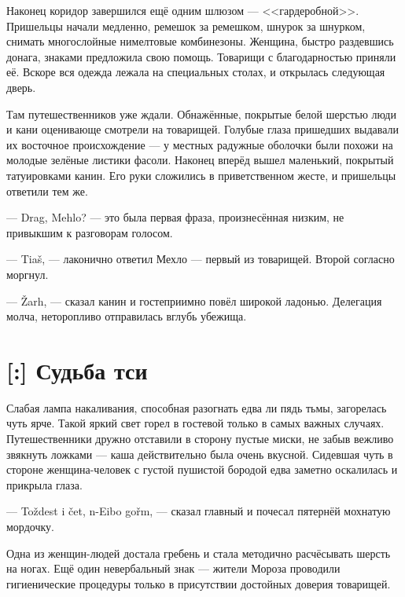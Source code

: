 Наконец коридор завершился ещё одним шлюзом --- <<гардеробной>>.
Пришельцы начали медленно, ремешок за ремешком, шнурок за шнурком, снимать многослойные нимелтовые комбинезоны.
Женщина, быстро раздевшись донага, знаками предложила свою помощь.
Товарищи с благодарностью приняли её.
Вскоре вся одежда лежала на специальных столах, и открылась следующая дверь.

Там путешественников уже ждали.
Обнажённые, покрытые белой шерстью люди и кани оценивающе смотрели на товарищей.
Голубые глаза пришедших выдавали их восточное происхождение --- у местных радужные оболочки были похожи на молодые зелёные листики фасоли.
Наконец вперёд вышел маленький, покрытый татуировками канин.
Его руки сложились в приветственном жесте, и пришельцы ответили тем же.

--- Drag\FM, Mehlo? --- это была первая фраза, произнесённая низким, не привыкшим к разговорам голосом.

--- Tia\v{s}\FM, --- лаконично ответил Мехло --- первый из товарищей.
Второй согласно моргнул.

--- \v{Z}arh\FM, --- сказал канин и гостеприимно повёл широкой ладонью.
Делегация молча, неторопливо отправилась вглубь убежища.

\section{[:] Судьба тси}

Слабая лампа накаливания, способная разогнать едва ли пядь тьмы, загорелась чуть ярче.
Такой яркий свет горел в гостевой только в самых важных случаях.
Путешественники дружно отставили в сторону пустые миски, не забыв вежливо звякнуть ложками --- каша действительно была очень вкусной.
Сидевшая чуть в стороне женщина-человек с густой пушистой бородой едва заметно оскалилась и прикрыла глаза.

--- To\v{z}dest i \v{c}et, n-Eibo go\v{r}m\FM, --- сказал главный и почесал пятернёй мохнатую мордочку.

Одна из женщин-людей достала гребень и стала методично расчёсывать шерсть на ногах.
Ещё один невербальный знак --- жители Мороза проводили гигиенические процедуры только в присутствии достойных доверия товарищей.

